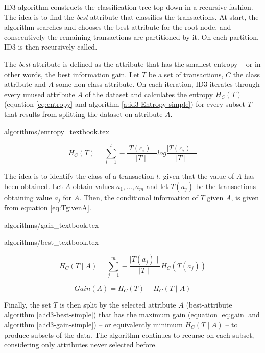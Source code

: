 ID3 algorithm constructs the classification tree top-down in a recursive fashion.
The idea is to find the \textit{best} attribute that classifies the transactions.
At start, the algorithm searches and chooses the best attribute for the root node, and consecutively the remaining transactions are partitioned by it.
On each partition, ID3 is then recursively called.

The \textit{best} attribute is defined as the attribute that has the smallest entropy -- or in other words, the best information gain.
Let $T$ be a set of transactions, $C$ the class attribute and $A$ some non-class attribute.
On each iteration, ID3 iterates through every unused attribute $A$ of the dataset and calculates the entropy $H_C(T)$ (equation \ref{eq:entropy} and algorithm \ref{a:id3-Entropy-simple}) for every subset $T$ that results from splitting the dataset on attribute $A$.

{algorithms/entropy_textbook.tex}

\begin{equation}\label{eq:entropy}
  H_C(T) = \sum_{i=1}^{l} - \frac{\mid T(c_i) \mid}{\mid T \mid} log{\frac{\mid T(c_i) \mid}{\mid T \mid}}
\end{equation}

The idea is to identify the class of a transaction $t$, given that the value of $A$ has been obtained.
Let $A$ obtain values $a_1, \dots, a_m$ and let $T(a_j)$ be the transactions obtaining value $a_j$ for $A$.
Then, the conditional information of $T$ given $A$, is given from equation \ref{eq:TgivenA}.

{algorithms/gain_textbook.tex}

{algorithms/best_textbook.tex}

\begin{equation}\label{eq:TgivenA}
  H_C(T \mid A) = \sum_{j=1}^{m} - \frac{\mid T(a_j) \mid}{\mid T \mid} H_C(T(a_j))
\end{equation}

\begin{equation}\label{eq:gain}
  Gain(A) = H_C(T) - H_C(T \mid A)
\end{equation}


Finally, the set $T$ is then split by the selected attribute $A$ (best-attribute algorithm \ref{a:id3-best-simple}) that has the maximum gain (equation \ref{eq:gain} and algorithm \ref{a:id3-gain-simple}) -- or equivalently minimum $H_C(T \mid A)$ -- to produce subsets of the data.
The algorithm continues to recurse on each subset, considering only attributes never selected before.



